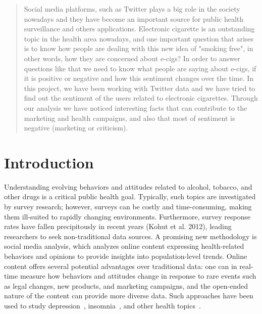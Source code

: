 \documentclass{sig-alternate}
\begin{document}
\maketitle
\begin{abstract}
Social media platforms, such as Twitter plays a big role in the society nowadays and they have become an important source for public health surveillance and others applications. Electronic cigarette is an outstanding topic in the health area nowadays, and one important question that arises is to know how people are dealing with this new idea of "smoking free", in other words, how they are concerned about e-cigs? In order to answer questions like that we need to know what people are saying about e-cigs, if it is positive or negative and how this sentiment changes over the time. In this project, we have been working with Twitter data and we have tried to find out the sentiment of the users related to electronic cigarettes. Through our analysis we have noticed interesting facts that can contribute to the marketing and health campaigns, and also that most of sentiment is negative (marketing or criticism). 
\end{abstract}



\section{Introduction}
Understanding evolving behaviors and attitudes related to alcohol, tobacco,
and other drugs is a critical public health goal. Typically, such topics are
investigated by survey research; however, surveys can be costly and
time-consuming, making them ill-suited to rapidly changing
environments. Furthermore, survey response rates have fallen precipitously in
recent years (Kohut et al. 2012), leading researchers to seek non-traditional
data sources. A promising new methodology is social media analysis, which
analyzes online content expressing health-related behaviors and opinions to
provide insights into population-level trends. Online content offers several
potential advantages over traditional data: one can in real-time measure how
behaviors and attitudes change in response to rare events such as legal
changes, new products, and marketing campaigns, and the open-ended nature of
the content can provide more diverse data. Such approaches have been used to
study depression~\cite{choudhury2013predicting}, insomnia~\cite{powell2012i},
and other health topics~\cite{dredze2012how}.
\end{document}
